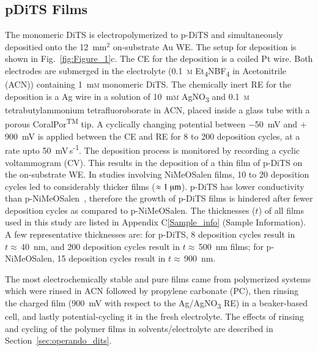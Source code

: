 \subsection{pDiTS Films}
The monomeric DiTS is electropolymerized to p-DiTS and simultaneously depositied onto the 12~mm$^2$ on-substrate Au WE. The setup for deposition is shown in Fig.~\ref{fig:Figure_1}c. The CE for the deposition is a coiled Pt wire. Both electrodes are submerged in the electrolyte (0.1~\textsc{m} Et\textsubscript{4}NBF\textsubscript{4} in Acetonitrile (ACN)) containing 1~m\textsc{m} monomeric DiTS. The chemically inert RE for the deposition is a Ag wire in a solution of 10~m\textsc{m} AgNO\textsubscript{3} and 0.1~\textsc{m} tetrabutylammonium tetrafluoroborate in ACN, placed inside a glass tube with a porous CoralPor\textsuperscript{TM} tip. A cyclically changing potential between $-$50~mV and $+$900~mV is applied between the CE and RE for 8 to 200 deposition cycles, at a rate upto 50~mV\,s\textsuperscript{-1}. The deposition process is monitored by recording a cyclic voltammogram (CV). This results in the deposition of a thin film of p-DiTS on the on-substrate WE. In studies involving NiMeOSalen films, 10 to 20 deposition cycles led to considerably thicker films ($\approx 1~\muup \textrm{m}$). p-DiTS has lower conductivity than p-NiMeOSalen~\cite{Vereshchagin2020}, therefore the growth of p-DiTS films is hindered after fewer deposition cycles as compared to p-NiMeOSalen. The thicknesses ($t$) of all films used in this study are listed in Appendix C\ref{Sample_info} (Sample Information). A few representative thicknesses are: for p-DiTS, 8 deposition cycles result in $t\approx\,$40~nm, and 200 deposition cycles result in $t\approx\,$500~nm films; for p-NiMeOSalen, 15 deposition cycles result in $t\approx\,$900~nm.
\par


The most electrochemically stable and pure films came from polymerized systems which were rinsed in ACN followed by propylene carbonate (PC), then rinsing the charged film (900~mV with respect to the Ag/AgNO\textsubscript{3} RE) in a beaker-based cell, and lastly potential-cycling it in the fresh electrolyte. The effects of rinsing and cycling of the polymer films in solvents/electrolyte are described in Section~\ref{sec:operando_dits}.




